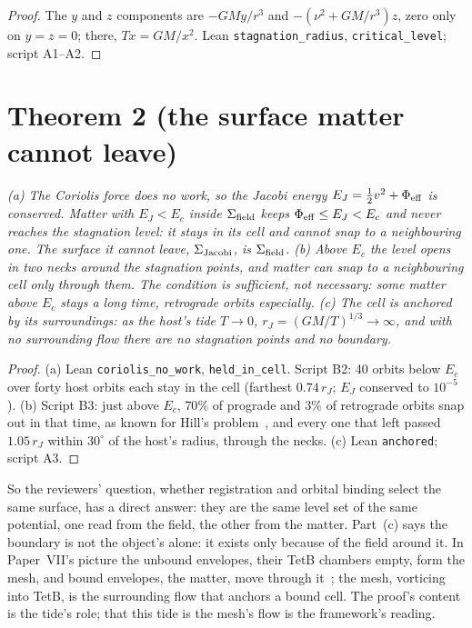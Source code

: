 \documentclass[twocolumn]{iopjournal}
\begin{document}
\begin{proof}
The $y$ and $z$ components are $-GMy/r^3$ and $-(\nu^2 + GM/r^3)z$,
zero only on $y = z = 0$; there, $Tx = GM/x^2$. Lean
\texttt{stagnation\_radius}, \texttt{critical\_level}; script A1--A2.
\end{proof}


\section*{Theorem 2 (the surface matter cannot leave)}

\emph{(a) The Coriolis force does no work, so the Jacobi energy $E_J =
\tfrac12v^2 + \Phi_{\rm eff}$ is conserved. Matter with $E_J < E_c$
inside $\Sigma_{\rm field}$ keeps $\Phi_{\rm eff} \le E_J < E_c$ and
never reaches the stagnation level: it stays in its cell and cannot snap
to a neighbouring one. The surface it cannot leave,
$\Sigma_{\rm Jacobi}$, is $\Sigma_{\rm field}$. (b) Above $E_c$ the
level opens in two necks around the stagnation points, and matter can
snap to a neighbouring cell only through them. The condition is
sufficient, not necessary: some matter above $E_c$ stays a long time,
retrograde orbits especially. (c) The cell is anchored by its
surroundings: as the host's tide $T \to 0$, $r_J = (GM/T)^{1/3} \to
\infty$, and with no surrounding flow there are no stagnation points
and no boundary.}

\begin{proof}
(a) Lean \texttt{coriolis\_no\_work}, \texttt{held\_in\_cell}. Script
B2: 40 orbits below $E_c$ over forty host orbits each stay in the cell
(farthest $0.74\,r_J$; $E_J$ conserved to $10^{-5}$). (b) Script B3:
just above $E_c$, $70\%$ of prograde and $3\%$ of retrograde orbits
snap out in that time, as known for Hill's problem~\cite{Henon1970},
and every one that left passed $1.05\,r_J$ within $30^\circ$ of the
host's radius, through the necks. (c) Lean \texttt{anchored}; script
A3.
\end{proof}

So the reviewers' question, whether registration and orbital binding
select the same surface, has a direct answer: they are the same level
set of the same potential, one read from the field, the other from the
matter. Part~(c) says the boundary is not the object's alone: it exists
only because of the field around it. In Paper~VII's picture the
unbound envelopes, their TetB chambers empty, form the mesh, and bound
envelopes, the matter, move through it~\cite{NelsonVII}; the mesh,
vorticing into TetB, is the surrounding flow that anchors a bound cell.
The proof's content is the tide's role; that this tide is the mesh's
flow is the framework's reading.
\end{document}

